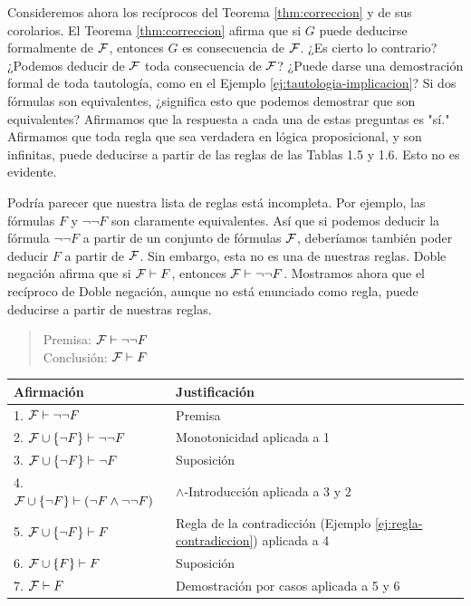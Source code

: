 \message{ !name(main.tex)}\documentclass[12pt,a4paper]{book}
\makeatletter
\newcommand{\comillas}[1]{"#1"}
\newenvironment{derivacion}{%
  \begingroup
  \renewcommand{\arraystretch}{1.35}
  \begin{center}
  \begin{tabular}{@{}l l@{}}
    \textbf{Afirmación} & \textbf{Justificación}\\
    \hline
}{%
  \end{tabular}
  \end{center}
  \endgroup
}
\makeatother
\begin{document}
    Consideremos ahora los recíprocos del Teorema \ref{thm:correccion} y de sus corolarios. El Teorema \ref{thm:correccion}
    afirma que si $G$ puede deducirse formalmente de $\mathcal{F}$, entonces $G$ es consecuencia de $\mathcal{F}$. ¿Es cierto lo contrario?
    ¿Podemos deducir de $\mathcal{F}$ toda consecuencia de $\mathcal{F}$? ¿Puede darse una demostración formal de toda tautología, como en el
    Ejemplo \ref{ej:tautologia-implicacion}? Si dos fórmulas son equivalentes, ¿significa esto que podemos demostrar que son
    equivalentes? Afirmamos que la respuesta a cada una de estas preguntas es \comillas{sí.} Afirmamos que toda regla que sea
    verdadera en lógica proposicional, y son infinitas, puede deducirse a partir de las reglas de las Tablas 1.5 y 1.6. Esto no
    es evidente.

    \begin{ejemplo}\label{ej:doble-negacion-reciproco}
        Podría parecer que nuestra lista de reglas está incompleta. Por ejemplo, las fórmulas $F$ y $\neg\neg F$ son claramente
        equivalentes. Así que si podemos deducir la fórmula $\neg\neg F$ a partir de un conjunto de fórmulas $\mathcal{F}$, deberíamos
        también poder deducir $F$ a partir de $\mathcal{F}$. Sin embargo, esta no es una de nuestras reglas. Doble negación afirma que
        si $\mathcal{F}\vdash F$, entonces $\mathcal{F}\vdash\neg\neg F$. Mostramos ahora que el recíproco de Doble negación, aunque no está
        enunciado como regla, puede deducirse a partir de nuestras reglas.

        \begin{quote}
            Premisa: $\mathcal{F}\vdash\neg\neg F$\\
            Conclusión: $\mathcal{F}\vdash F$
        \end{quote}

        \begin{derivacion}
            1. $\mathcal{F}\vdash\neg\neg F$ & Premisa\\
            2. $\mathcal{F}\cup\{\neg F\}\vdash\neg\neg F$ & Monotonicidad aplicada a 1\\
            3. $\mathcal{F}\cup\{\neg F\}\vdash\neg F$ & Suposición\\
            4. $\mathcal{F}\cup\{\neg F\}\vdash(\neg F\wedge\neg\neg F)$ & $\wedge$-Introducción aplicada a 3 y 2\\
            5. $\mathcal{F}\cup\{\neg F\}\vdash F$ & Regla de la contradicción (Ejemplo \ref{ej:regla-contradiccion}) aplicada a 4\\
            6. $\mathcal{F}\cup\{F\}\vdash F$ & Suposición\\
            7. $\mathcal{F}\vdash F$ & Demostración por casos aplicada a 5 y 6\\
        \end{derivacion}
    \end{ejemplo}
\end{document}
